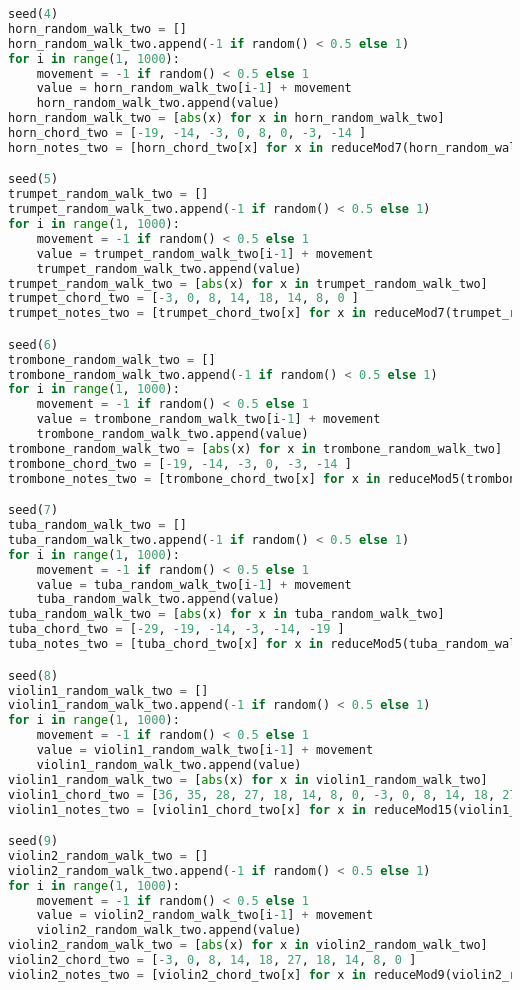 \begin{lstlisting}[language=Python, caption=Tianshu Segment\_II]
seed(4)
horn_random_walk_two = []
horn_random_walk_two.append(-1 if random() < 0.5 else 1)
for i in range(1, 1000):
    movement = -1 if random() < 0.5 else 1
    value = horn_random_walk_two[i-1] + movement
    horn_random_walk_two.append(value)
horn_random_walk_two = [abs(x) for x in horn_random_walk_two]
horn_chord_two = [-19, -14, -3, 0, 8, 0, -3, -14 ]
horn_notes_two = [horn_chord_two[x] for x in reduceMod7(horn_random_walk_two)]

seed(5)
trumpet_random_walk_two = []
trumpet_random_walk_two.append(-1 if random() < 0.5 else 1)
for i in range(1, 1000):
    movement = -1 if random() < 0.5 else 1
    value = trumpet_random_walk_two[i-1] + movement
    trumpet_random_walk_two.append(value)
trumpet_random_walk_two = [abs(x) for x in trumpet_random_walk_two]
trumpet_chord_two = [-3, 0, 8, 14, 18, 14, 8, 0 ]
trumpet_notes_two = [trumpet_chord_two[x] for x in reduceMod7(trumpet_random_walk_two)]

seed(6)
trombone_random_walk_two = []
trombone_random_walk_two.append(-1 if random() < 0.5 else 1)
for i in range(1, 1000):
    movement = -1 if random() < 0.5 else 1
    value = trombone_random_walk_two[i-1] + movement
    trombone_random_walk_two.append(value)
trombone_random_walk_two = [abs(x) for x in trombone_random_walk_two]
trombone_chord_two = [-19, -14, -3, 0, -3, -14 ]
trombone_notes_two = [trombone_chord_two[x] for x in reduceMod5(trombone_random_walk_two)]

seed(7)
tuba_random_walk_two = []
tuba_random_walk_two.append(-1 if random() < 0.5 else 1)
for i in range(1, 1000):
    movement = -1 if random() < 0.5 else 1
    value = tuba_random_walk_two[i-1] + movement
    tuba_random_walk_two.append(value)
tuba_random_walk_two = [abs(x) for x in tuba_random_walk_two]
tuba_chord_two = [-29, -19, -14, -3, -14, -19 ]
tuba_notes_two = [tuba_chord_two[x] for x in reduceMod5(tuba_random_walk_two)]

seed(8)
violin1_random_walk_two = []
violin1_random_walk_two.append(-1 if random() < 0.5 else 1)
for i in range(1, 1000):
    movement = -1 if random() < 0.5 else 1
    value = violin1_random_walk_two[i-1] + movement
    violin1_random_walk_two.append(value)
violin1_random_walk_two = [abs(x) for x in violin1_random_walk_two]
violin1_chord_two = [36, 35, 28, 27, 18, 14, 8, 0, -3, 0, 8, 14, 18, 27, 28, 35 ]
violin1_notes_two = [violin1_chord_two[x] for x in reduceMod15(violin1_random_walk_two)]

seed(9)
violin2_random_walk_two = []
violin2_random_walk_two.append(-1 if random() < 0.5 else 1)
for i in range(1, 1000):
    movement = -1 if random() < 0.5 else 1
    value = violin2_random_walk_two[i-1] + movement
    violin2_random_walk_two.append(value)
violin2_random_walk_two = [abs(x) for x in violin2_random_walk_two]
violin2_chord_two = [-3, 0, 8, 14, 18, 27, 18, 14, 8, 0 ]
violin2_notes_two = [violin2_chord_two[x] for x in reduceMod9(violin2_random_walk_two)]


\end{lstlisting}
